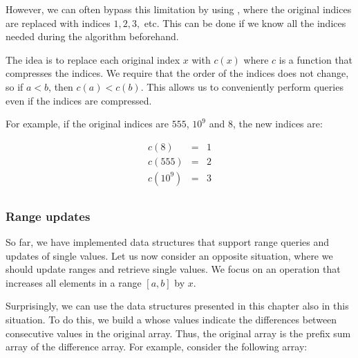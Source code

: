 
However, we can often bypass this limitation
by using ,
where the original indices are replaced
with indices $1,2,3,$ etc.
This can be done if we know all the indices
needed during the algorithm beforehand.

The idea is to replace each original index $x$
with $c(x)$ where $c$ is a function that
compresses the indices.
We require that the order of the indices
does not change, so if $a<b$, then $c(a)<c(b)$.
This allows us to conveniently perform queries
even if the indices are compressed.

For example, if the original indices are
$555$, $10^9$ and $8$, the new indices are:

\[
\begin{array}{lcl}
c(8) & = & 1 \\
c(555) & = & 2 \\
c(10^9) & = & 3 \\
\end{array}
\]

\subsubsection{Range updates}

So far, we have implemented data structures
that support range queries and updates
of single values.
Let us now consider an opposite situation,
where we should update ranges and
retrieve single values.
We focus on an operation that increases all
elements in a range $[a,b]$ by $x$.


Surprisingly, we can use the data structures
presented in this chapter also in this situation.
To do this, we build a 
whose values indicate
the differences between consecutive values
in the original array.
Thus, the original array is the
prefix sum array of the
difference array.
For example, consider the following array:

\begin{center}
\end{center}

